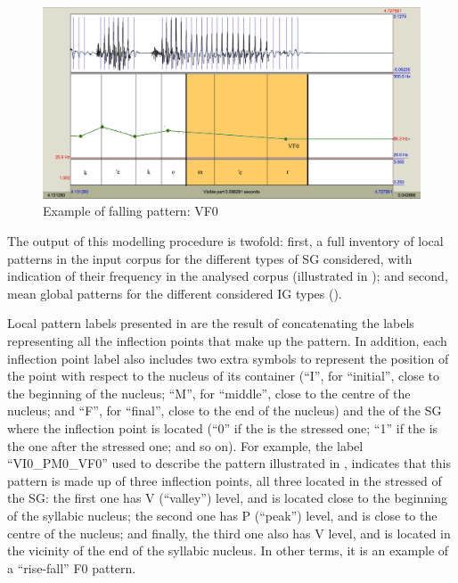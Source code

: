 \documentclass[output=paper]{langsci/langscibook}
\begin{document}
\begin{figure}
\includegraphics[width=\textwidth]{figures/GAR-img010.png}
\caption{Example of falling pattern: VF0 \citep{Garrido2012enton}}
\label{fig:gar:10}
\end{figure}

The output of this modelling procedure is twofold: first, a full inventory of local patterns in the input corpus for the different types of SG considered, with indication of their frequency in the analysed corpus (illustrated in ); and second, mean global patterns for the different considered IG types ().

Local pattern labels presented in  are the result of concatenating the labels representing all the inflection points that make up the pattern. In addition, each inflection point label also includes two extra symbols to represent the position of the point with respect to the nucleus of its container  (``I'', for ``initial'', close to the beginning of the  nucleus; ``M'', for ``middle'', close to the centre of the nucleus; and ``F'', for ``final'', close to the end of the nucleus) and the  of the SG where the inflection point is located (``0'' if the  is the stressed one; ``1'' if the  is the one after the stressed one; and so on). For example, the label ``VI0\_PM0\_VF0'' used to describe the pattern illustrated in , indicates that this pattern is made up of three inflection points, all three located in the stressed  of the SG: the first one has V (``valley'') level, and is located close to the beginning of the syllabic nucleus; the second one has P (``peak'') level, and is close to the centre of the  nucleus; and finally, the third one also has V level, and is located in the vicinity of the end of the syllabic nucleus. In other terms, it is an example of a ``rise-fall'' F0 pattern.
\end{document}

